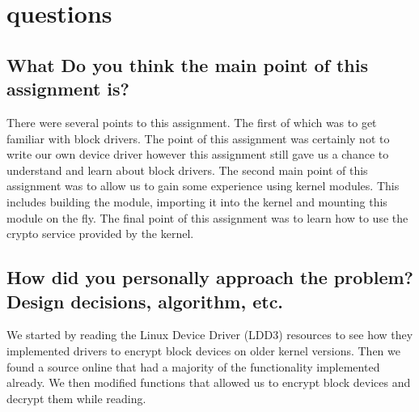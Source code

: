\documentclass[draftclsnofoot, onecolumn, compsoc, 10pt]{IEEEtran}
\begin{document}
\section{questions}
    \subsection{What Do you think the main point of this assignment is?}
    There were several points to this assignment. The first of which was to get familiar with block drivers. The point of this assignment was certainly not to write our own device driver however this assignment still gave us a chance to understand and learn about block drivers. The second main point of this assignment was to allow us to gain some experience using kernel modules. This includes building the module, importing it into the kernel and mounting this module on the fly. The final point of this assignment was to learn how to use the crypto service provided by the kernel.\\

    \subsection{How did you personally approach the problem? Design decisions, algorithm, etc.}
    We started by reading the Linux Device Driver (LDD3) resources to see how they implemented drivers to encrypt block devices on older kernel versions. Then we found a source online that had a majority of the functionality implemented already. We then modified functions that allowed us to encrypt block devices and decrypt them while reading.
\end{document}

